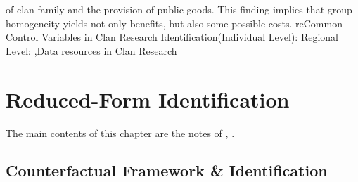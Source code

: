 \documentclass[10pt]{report}
\begin{document}
of clan family and the provision of public goods. This finding implies that group homogeneity yields not only benefits, but also some possible costs.
re{Common Control Variables in Clan Research Identification(Individual Level):
        Regional Level:
        }
\sep{Data resources in Clan Research}

\clearpage
\section{Reduced-Form Identification}
The main contents of this chapter are the notes of \cite{angrist2014mastering}, \cite{angrist2009mostly}.

\subsection{Counterfactual Framework \& Identification}
\end{document}
